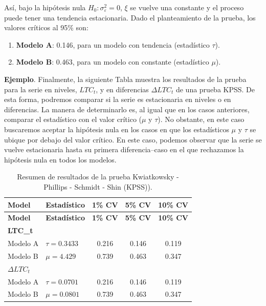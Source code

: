 \documentclass[
]{book}
\begin{document}
Así, bajo la hipótesis nula \(H_0 : \sigma^2_\varepsilon = 0\), \(\xi\) se vuelve una constante y el proceso puede tener una tendencia estacionaria. Dado el planteamiento de la prueba, los valores críticos al 95\% son:

\begin{enumerate}
\def\labelenumi{\arabic{enumi}.}
\item
  \textbf{Modelo A}: 0.146, para un modelo con tendencia (estadístico \(\tau\)).
\item
  \textbf{Modelo B}: 0.463, para un modelo con constante (estadístico \(\mu\)).
\end{enumerate}

\textbf{Ejemplo}. Finalmente, la siguiente Tabla muestra los resultados de la prueba para la serie en niveles, \(LTC_t\), y en diferencias \(\Delta LTC_t\) de una prueba KPSS. De esta forma, podremos comparar si la serie es estacionaria en niveles o en diferencias. La manera de determinarlo es, al igual que en los casos anteriores, comparar el estadístico con el valor crítico (\(\mu\) y \(\tau\)). No obstante, en este caso buscaremos aceptar la hipótesis nula en los casos en que los estadísticos \(\mu\) y \(\tau\) se ubique por debajo del valor crítico. En este caso, podemos observar que la serie se vuelve estacionaria hasta su primera diferencia--caso en el que rechazamos la hipótesis nula en todos los modelos.

\begin{longtable}[]{@{}llccc@{}}
\caption{\label{tab:KPSS-summary} Resumen de resultados de la prueba Kwiatkowsky - Phillips - Schmidt - Shin (KPSS)).}\tabularnewline
\toprule\noalign{}
\textbf{Model} & \textbf{Estadístico} & \textbf{1\% CV} & \textbf{5\% CV} & \textbf{10\% CV} \\
\midrule\noalign{}
\endfirsthead
\toprule\noalign{}
\textbf{Model} & \textbf{Estadístico} & \textbf{1\% CV} & \textbf{5\% CV} & \textbf{10\% CV} \\
\midrule\noalign{}
\endhead
\bottomrule\noalign{}
\endlastfoot
\textbf{LTC\_t} & & & & \\
Modelo A & \(\tau = 0.3433\) & 0.216 & 0.146 & 0.119 \\
Modelo B & \(\mu = 4.429\) & 0.739 & 0.463 & 0.347 \\
\textbf{\(\Delta LTC_t\)} & & & & \\
Modelo A & \(\tau = 0.0701\) & 0.216 & 0.146 & 0.119 \\
Modelo B & \(\mu = 0.0801\) & 0.739 & 0.463 & 0.347 \\
\end{longtable}
\end{document}
